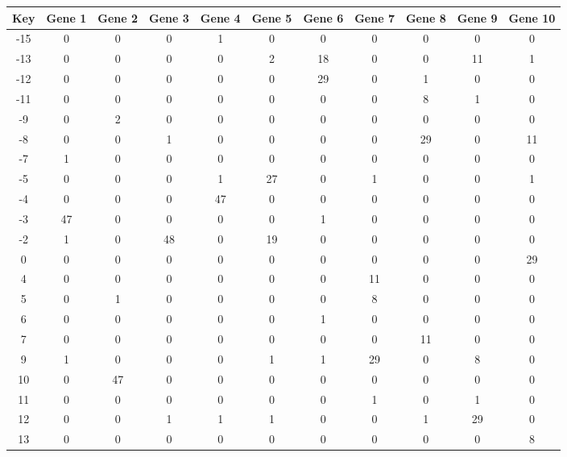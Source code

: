 \begin{tabular}{|c|c|c|c|c|c|c|c|c|c|c|}
\hline
Key & Gene 1 & Gene 2 & Gene 3 & Gene 4 & Gene 5 & Gene 6 & Gene 7 & Gene 8 & Gene 9 & Gene 10 \\
\hline
-15 & 0 & 0 & 0 & 1 & 0 & 0 & 0 & 0 & 0 & 0 \\
-13 & 0 & 0 & 0 & 0 & 2 & 18 & 0 & 0 & 11 & 1 \\
-12 & 0 & 0 & 0 & 0 & 0 & 29 & 0 & 1 & 0 & 0 \\
-11 & 0 & 0 & 0 & 0 & 0 & 0 & 0 & 8 & 1 & 0 \\
-9 & 0 & 2 & 0 & 0 & 0 & 0 & 0 & 0 & 0 & 0 \\
-8 & 0 & 0 & 1 & 0 & 0 & 0 & 0 & 29 & 0 & 11 \\
-7 & 1 & 0 & 0 & 0 & 0 & 0 & 0 & 0 & 0 & 0 \\
-5 & 0 & 0 & 0 & 1 & 27 & 0 & 1 & 0 & 0 & 1 \\
-4 & 0 & 0 & 0 & 47 & 0 & 0 & 0 & 0 & 0 & 0 \\
-3 & 47 & 0 & 0 & 0 & 0 & 1 & 0 & 0 & 0 & 0 \\
-2 & 1 & 0 & 48 & 0 & 19 & 0 & 0 & 0 & 0 & 0 \\
0 & 0 & 0 & 0 & 0 & 0 & 0 & 0 & 0 & 0 & 29 \\
4 & 0 & 0 & 0 & 0 & 0 & 0 & 11 & 0 & 0 & 0 \\
5 & 0 & 1 & 0 & 0 & 0 & 0 & 8 & 0 & 0 & 0 \\
6 & 0 & 0 & 0 & 0 & 0 & 1 & 0 & 0 & 0 & 0 \\
7 & 0 & 0 & 0 & 0 & 0 & 0 & 0 & 11 & 0 & 0 \\
9 & 1 & 0 & 0 & 0 & 1 & 1 & 29 & 0 & 8 & 0 \\
10 & 0 & 47 & 0 & 0 & 0 & 0 & 0 & 0 & 0 & 0 \\
11 & 0 & 0 & 0 & 0 & 0 & 0 & 1 & 0 & 1 & 0 \\
12 & 0 & 0 & 1 & 1 & 1 & 0 & 0 & 1 & 29 & 0 \\
13 & 0 & 0 & 0 & 0 & 0 & 0 & 0 & 0 & 0 & 8 \\
\hline
\end{tabular}